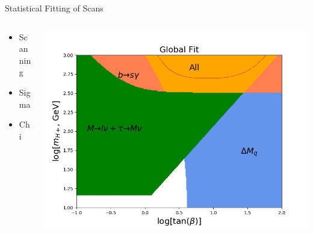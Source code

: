 \documentclass[10pt,xcolor={table,dvipsnames},t]{beamer}
\begin{document}
\begin{frame}{Statistical Fitting of Scans}
    \begin{columns}[T]
        \begin{column}{0.35\textwidth}
            \vspace{1.5em}
            \begin{itemize}
                \item Scanning
                \item Sigma
                \item Chi
            \end{itemize}
        \end{column}
        \begin{column}{0.6\textwidth}
            \includegraphics[scale=0.35]{global_08}
        \end{column}
    \end{columns}
\end{frame}
\end{document}
